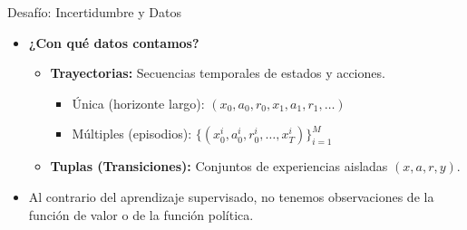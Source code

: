 \documentclass[xcolor=dvipsnames, handout]{beamer}
\begin{document}
\begin{frame}{Desafío: Incertidumbre y Datos}
\begin{itemize}
    \item \textbf{¿Con qué datos contamos?} 
    \begin{itemize}
        \item<2-> \textbf{Trayectorias:} Secuencias temporales de estados y acciones.
        \begin{itemize}
            \item<3-> Única (horizonte largo): $(x_0, a_0, r_0, x_1, a_1, r_1, \dots)$
            \item<4-> Múltiples (episodios): $\{(x_0^i, a_0^i, r_0^i, \dots, x_T^i)\}_{i=1}^M$
        \end{itemize}
        \item<5-> \textbf{Tuplas (Transiciones):} Conjuntos de experiencias aisladas $(x, a, r, y)$. 
    \end{itemize}
\item Al contrario del aprendizaje supervisado, no tenemos observaciones de la funci\'on de valor o de la funci\'on pol\'itica.
\end{itemize}
\end{frame}
\end{document}
